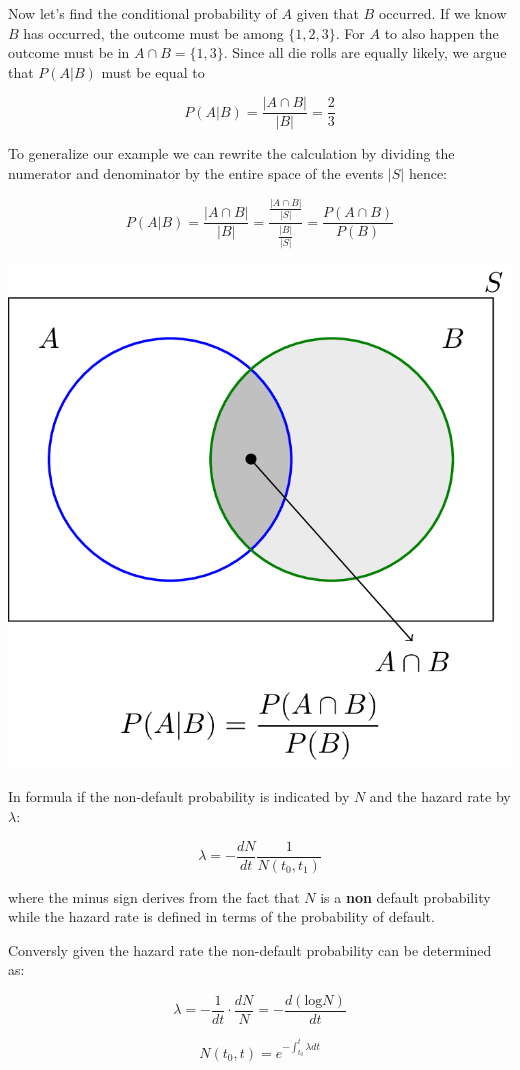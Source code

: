 \documentclass[11pt]{article}
\begin{document}
Now let's find the conditional probability of \(A\) given that \(B\)
occurred. If we know \(B\) has occurred, the outcome must be among
\(\{1,2,3\}\). For \(A\) to also happen the outcome must be in
\(A\cap B = \{1,3\}\). Since all die rolls are equally likely, we argue
that \(P(A|B)\) must be equal to

\[P(A|B) = \frac{|A\cap B|}{|B|} = \frac{2}{3}\]

To generalize our example we can rewrite the calculation by dividing the
numerator and denominator by the entire space of the events \(|S|\)
hence:

\[P(A|B) = \frac{|A\cap B|}{|B|} = \frac{\frac{|A\cap B|}{|S|}}{\frac{|B|}{|S|}} = \frac{P(A\cap B)}{P(B)}\]

\begin{center}
\includegraphics[width=0.7\linewidth]{conditional_b.png}
\end{center}

In formula if the non-default probability is indicated by \(N\) and the
hazard rate by \(\lambda\):

\[\lambda = -\frac{dN}{dt}\frac{1}{N(t_0, t_1)}\]

where the minus sign derives from the fact that \(N\) is a \textbf{non}
default probability while the hazard rate is defined in terms of the
probability of default.

Conversly given the hazard rate the non-default probability can be
determined as:

\[\lambda = -\frac{1}{dt}\cdot\frac{dN}{N} = -\frac{d(\textrm{log}N)}{dt}\]

\[N(t_0, t) = e^{-\int_{t_0}^{t}\lambda dt}\]
\end{document}
